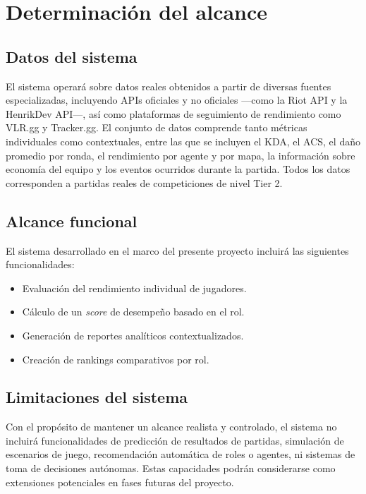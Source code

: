 \documentclass{ULBreport} %
\begin{document}
\section{Determinación del alcance}

\subsection{Datos del sistema}

El sistema operará sobre datos reales obtenidos a partir de diversas fuentes especializadas, incluyendo APIs oficiales y no oficiales ---como la Riot API y la HenrikDev API---, así como plataformas de seguimiento de rendimiento como VLR.gg y Tracker.gg. El conjunto de datos comprende tanto métricas individuales como contextuales, entre las que se incluyen el KDA, el ACS, el daño promedio por ronda, el rendimiento por agente y por mapa, la información sobre economía del equipo y los eventos ocurridos durante la partida. Todos los datos corresponden a partidas reales de competiciones de nivel Tier 2.

\subsection{Alcance funcional}

El sistema desarrollado en el marco del presente proyecto incluirá las siguientes funcionalidades:

\begin{itemize}
    \item Evaluación del rendimiento individual de jugadores.
    \item Cálculo de un \textit{score} de desempeño basado en el rol.
    \item Generación de reportes analíticos contextualizados.
    \item Creación de rankings comparativos por rol.
\end{itemize}

\subsection{Limitaciones del sistema}

Con el propósito de mantener un alcance realista y controlado, el sistema no incluirá funcionalidades de predicción de resultados de partidas, simulación de escenarios de juego, recomendación automática de roles o agentes, ni sistemas de toma de decisiones autónomas. Estas capacidades podrán considerarse como extensiones potenciales en fases futuras del proyecto.
\end{document}
